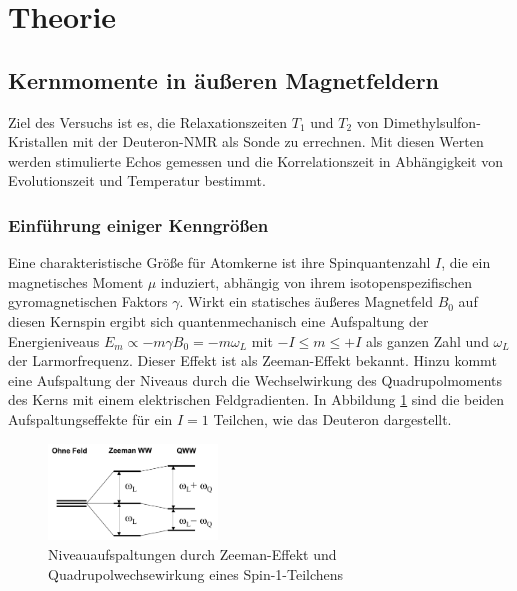 
\setcounter{page}{1}
\section{Theorie}
\subsection{Kernmomente in äußeren Magnetfeldern}
Ziel des Versuchs ist es, die Relaxationszeiten $T_1$ und $T_2$ von Dimethylsulfon-Kristallen mit der Deuteron-NMR als Sonde zu errechnen. Mit diesen Werten
werden stimulierte Echos gemessen und die Korrelationszeit in Abhängigkeit von Evolutionszeit und Temperatur bestimmt.

\subsubsection{Einführung einiger Kenngrößen}
Eine charakteristische Größe für Atomkerne ist ihre Spinquantenzahl $I$, die ein magnetisches Moment $\mu$ induziert, abhängig von ihrem isotopenspezifischen
gyromagnetischen Faktors $\gamma$. Wirkt ein statisches äußeres Magnetfeld $B_0$ auf diesen Kernspin ergibt sich quantenmechanisch eine Aufspaltung der
Energieniveaus $E_m \propto - m \gamma B_0 = -m \omega_L $ mit $-I \leq m \leq +I$ als ganzen Zahl und $\omega_L$ der Larmorfrequenz. Dieser Effekt 
ist als Zeeman-Effekt bekannt. Hinzu kommt eine Aufspaltung der Niveaus durch die Wechselwirkung des Quadrupolmoments des Kerns mit einem elektrischen 
Feldgradienten. In Abbildung \ref{pic_deuteron} sind die beiden Aufspaltungseffekte für ein $I=1$ Teilchen, wie das Deuteron dargestellt.

\begin{figure}[H]
 \includegraphics[width=0.4\textwidth]{../pics/deuteron.jpg}
 \caption{Niveauaufspaltungen durch Zeeman-Effekt und Quadrupolwechsewirkung eines Spin-1-Teilchens}
 \label{pic_deuteron}
\end{figure}

